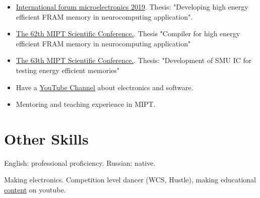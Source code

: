 \documentclass{article}
\begin{document}
\begin{itemize}
\item \href{https://microelectronica.pro/}{International forum microelectronics 2019}. Thesis: "Developing high energy efficient FRAM memory in neurocomputing application".
\item  \href{https://conf62.mipt.ru/}{The 62th MIPT Scientific Conference.}. Thesis "Compiler for high energy efficient FRAM memory in neurocomputing application"
\item \href{https://mipt.ru/science/5top100/education/courseproposal/%D0%A4%D0%AD%D0%A4%D0%9C.pdf}{The 63th MIPT Scientific Conference.}. Thesis: "Development of SMU IC for testing energy efficient memories"
\item Have a \href{https://www.youtube.com/channel/UCAjmXQnYQjWoVHx6NIo24CQ}{YouTube Channel} about electronics and software.
\item Mentoring and teaching experience in MIPT.
\end{itemize}
 
 
\section{Other Skills}
\begin{description}[widest=Langauges]
\item[Languages] English: professional proficiency.  Russian: native.
\item[Hobbies] Making electronics. Competition level dancer (WCS, Hustle), making educational \href{https://www.youtube.com/channel/UCAjmXQnYQjWoVHx6NIo24CQ}{content} on youtube.
\end{description}
 
\end{document}
